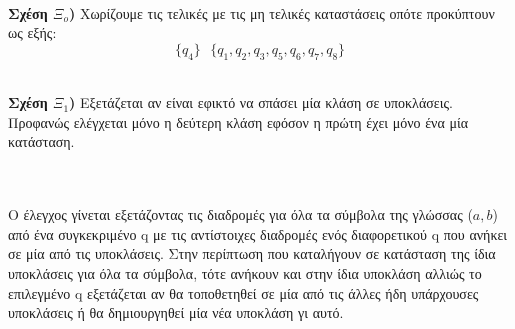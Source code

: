 \noindent\\
\textbf{Σχέση $\Xi_o$) } Χωρίζουμε τις τελικές με τις μη τελικές καταστάσεις οπότε προκύπτουν ως εξής: 
\begin{equation}
	\{q_4\} \text{ } \{q_1, q_2, q_3, q_5, q_6, q_7, q_8\}
\end{equation}

\noindent\\
\textbf{Σχέση $\Xi_1$) } Εξετάζεται αν είναι εφικτό να σπάσει μία κλάση σε υποκλάσεις. Προφανώς ελέγχεται μόνο η δεύτερη κλάση εφόσον η πρώτη έχει μόνο ένα μία κατάσταση. 

\noindent\\\\
Ο έλεγχος γίνεται εξετάζοντας τις διαδρομές για όλα τα σύμβολα της γλώσσας ($a,b$) από ένα συγκεκριμένο q με τις αντίστοιχες διαδρομές ενός διαφορετικού q που ανήκει σε μία από τις υποκλάσεις. Στην περίπτωση που καταλήγουν σε κατάσταση της ίδια υποκλάσεις για όλα τα σύμβολα, τότε ανήκουν και στην ίδια υποκλάση αλλιώς το επιλεγμένο q εξετάζεται αν θα τοποθετηθεί σε μία από τις άλλες ήδη υπάρχουσες υποκλάσεις ή θα δημιουργηθεί μία νέα υποκλάση γι αυτό.

